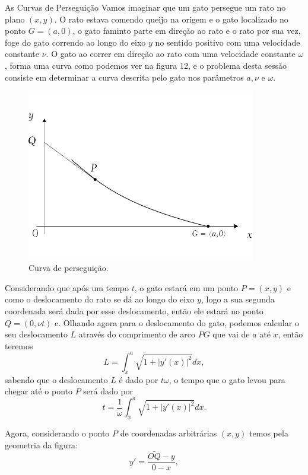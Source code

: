 \documentclass[blue]{beamer}
\numberwithin{equation}{section}
\begin{document}
\begin{frame}{As Curvas de Perseguição}
	\justifying
\hspace{0.2cm} Vamos imaginar que um gato persegue um rato no plano $(x,y)$. O rato estava comendo queijo na origem e o gato localizado no ponto $G = (a,0)$, o gato faminto parte em direção ao rato e o rato por sua vez, foge do gato correndo ao longo do eixo $y$ no sentido positivo com uma velocidade constante $\nu$. O gato ao correr em direção ao rato com uma velocidade constante $\omega$, forma uma curva como podemos ver na figura 12, e o problema desta sessão consiste em determinar a curva descrita pelo gato nos parâmetros $a, \nu$ e $\omega$. 

\end{frame}

\begin{frame}{}
	\begin{figure}[ht!]
	\centering
	\includegraphics[width=10cm]{Figura12}
	\caption{Curva de perseguição.}
\end{figure}
\end{frame}

\begin{frame}
\justifying
\hspace{0.2cm} Considerando que após um tempo $t$, o gato estará em um ponto $P = (x,y)$ e como o deslocamento do rato se dá ao longo do eixo $y$, logo a sua segunda coordenada será dada por esse deslocamento, então ele estará no ponto $Q = (0,\nu t)$ c. Olhando agora para o deslocamento do gato, podemos calcular o seu deslocamento $L$ através do comprimento de arco $PG$ que vai de $a$ até $x$, então teremos 
$$L = \int_x^a \sqrt{1 + |y'(x)|^2} dx,$$
sabendo que o deslocamento $L$ é dado por $t \omega$, o tempo que o gato levou para chegar até o ponto $P$ será dado por
\begin{equation} \label{50}
t = \dfrac{1}{\omega} \int_x^a \sqrt{1 + |y'(x)|^2} dx.
\end{equation}

\hspace{0.2cm} Agora, considerando o ponto $P$ de coordenadas arbitrárias $(x,y)$ temos pela geometria da figura:
$$y' = \dfrac{\bar{OQ} - y}{0 - x},$$

\end{frame}
\end{document}
